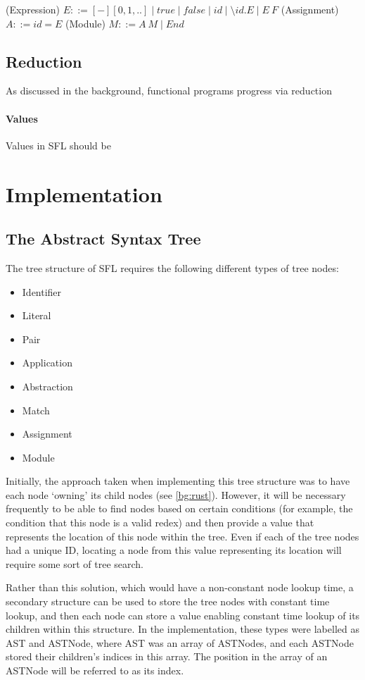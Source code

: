 \begin{syntax}
(Expression) \(E ::= [-][0, 1, ..] \mid true \mid false \mid id \mid \setminus id. E \mid E\:F\)\newline
(Assignment) \(A ::= id = E\)\newline
(Module) \(M ::= A\: M \mid End\)
\end{syntax}

\subsection{Reduction}
As discussed in the background, functional programs progress via reduction
\paragraph{Values}
\label{design:values}
Values in \ac{SFL} should be 

\section{Implementation}
\subsection{The Abstract Syntax Tree}
The tree structure of \ac{SFL} requires the following different types of tree nodes:
\begin{itemize}
    \item Identifier
    \item Literal
    \item Pair
    \item Application
    \item Abstraction
    \item Match
    \item Assignment
    \item Module
\end{itemize}
Initially, the approach taken when implementing this tree structure was to have each node `owning' its child nodes (see \ref{bg:rust}). However, it will be necessary frequently to be able to find nodes based on certain conditions (for example, the condition that this node is a valid redex) and then provide a value that represents the location of this node within the tree. Even if each of the tree nodes had a unique ID, locating a node from this value representing its location will require some sort of tree search.

Rather than this solution, which would have a non-constant node lookup time, a secondary structure can be used to store the tree nodes with constant time lookup, and then each node can store a value enabling constant time lookup of its children within this structure. In the implementation, these types were labelled as AST and ASTNode, where AST was an array of ASTNodes, and each ASTNode stored their children's indices in this array. The position in the array of an ASTNode will be referred to as its index.

